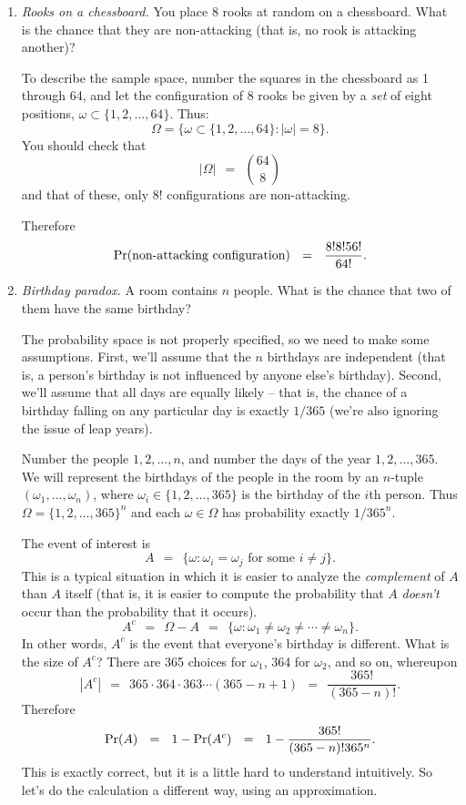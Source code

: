 \begin{enumerate}
\item {\it Rooks on a chessboard.} You place 8 rooks at random on a chessboard. What is the chance that they are non-attacking (that is, no rook is attacking another)?

To describe the sample space, number the squares in the chessboard as 1 through 64, and let the configuration of 8 rooks be given by a {\it set} of eight positions, $\omega \subset \{1,2,\ldots,64\}$. Thus:
$$\Omega = \{\omega \subset \{1,2,\ldots,64\}: |\omega| = 8 \} .$$
You should check that 
$$ |\Omega| \ \ = \ \ {64 \choose 8} $$
and that of these, only 8! configurations are non-attacking. 

Therefore
$$ \mbox{\rm Pr}(\mbox{non-attacking configuration}) \ \ = \ \ \frac{8!8!56!}{64!} .$$

\item {\it Birthday paradox.} A room contains $n$ people. What is the chance that two of them have the same birthday?

The probability space is not properly specified, so we need to make some assumptions. First, we'll assume that the $n$ birthdays are independent (that is, a person's birthday is not influenced by anyone else's birthday). Second, we'll assume that all days are equally likely -- that is, the chance of a birthday falling on any particular day is exactly $1/365$ (we're also ignoring the issue of leap years).

Number the people $1,2,\ldots, n$, and number the days of the year $1,2,\ldots, 365$. We will represent the birthdays of the people in the room by an $n$-tuple $(\omega_1, \ldots, \omega_n)$, where $\omega_i \in \{1,2,\ldots,365\}$ is the birthday of the $i$th person. Thus $\Omega = \{1,2,\ldots, 365\}^n$ and each $\omega \in \Omega$ has probability exactly $1/365^n$.

The event of interest is
$$ A  \ \ = \ \ \{\omega: \mbox{$\omega_i = \omega_j$ for some $i \neq j$} \}.$$
This is a typical situation in which it is easier to analyze the {\it complement} of $A$ than $A$ itself (that is, it is easier to compute the probability that $A$ {\it doesn't} occur than the probability that it occurs).
$$ A^c \ \ = \ \ \Omega - A \ \ = \ \ \{\omega: \omega_1 \neq \omega_2 \neq \cdots \neq \omega_n\}.$$
In other words, $A^c$ is the event that everyone's birthday is different. What is the size of $A^c$? There are 365 choices for $\omega_1$, 364 for $\omega_2$, and so on, whereupon
$$ |A^c| \ \ = \ \ 365 \cdot 364 \cdot 363 \cdots (365-n+1) \ \ = \ \ \frac{365!}{(365-n)!}.$$Therefore
$$ \mbox{\rm Pr}(A) \ \ = \ \ 1 - \mbox{\rm Pr}(A^c) \ \ = \ \ 1 - \frac{365!}{(365-n)!365^n} .$$
This is exactly correct, but it is a little hard to understand intuitively. So let's do the calculation a different way, using an approximation.


\end{enumerate}
